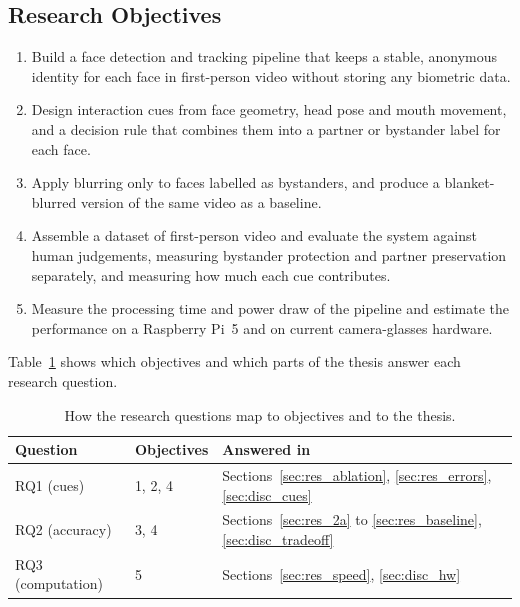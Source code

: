 \subsection{Research Objectives}

\begin{enumerate}
  \item Build a face detection and tracking pipeline that keeps a stable, anonymous
        identity for each face in first-person video without storing any biometric data.
  \item Design interaction cues from face geometry, head pose and mouth movement, and a
        decision rule that combines them into a partner or bystander label for each face.
  \item Apply blurring only to faces labelled as bystanders, and produce a blanket-blurred
        version of the same video as a baseline.
  \item Assemble a dataset of first-person video and evaluate the system against human
        judgements, measuring bystander protection and partner preservation separately,
        and measuring how much each cue contributes.
  \item Measure the processing time and power draw of the pipeline and estimate the
        performance on a Raspberry Pi~5 and on current camera-glasses hardware.
\end{enumerate}

Table~\ref{tab:rq_map} shows which objectives and which parts of the thesis answer each
research question.

\begin{table}[htbp]
\begin{singlespace}
\centering
\caption{How the research questions map to objectives and to the thesis.}
\label{tab:rq_map}
\renewcommand{\arraystretch}{1.3}
\begin{tabular}{@{}lll@{}}
\toprule
\textbf{Question} & \textbf{Objectives} & \textbf{Answered in} \\
\midrule
RQ1 (cues)        & 1, 2, 4 & Sections~\ref{sec:res_ablation}, \ref{sec:res_errors}, \ref{sec:disc_cues} \\
RQ2 (accuracy)    & 3, 4    & Sections~\ref{sec:res_2a} to \ref{sec:res_baseline}, \ref{sec:disc_tradeoff} \\
RQ3 (computation) & 5       & Sections~\ref{sec:res_speed}, \ref{sec:disc_hw} \\
\bottomrule
\end{tabular}
\end{singlespace}
\end{table}

